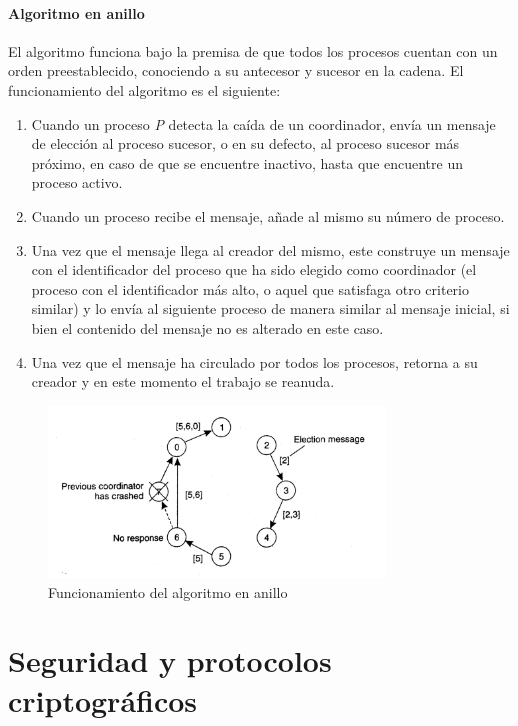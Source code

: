 \paragraph{Algoritmo en anillo}

El algoritmo funciona bajo la premisa de que todos los procesos cuentan con un orden preestablecido, conociendo a su antecesor y sucesor en la cadena\cite{Tanenbaum:2006:DSP:1202502:Ch6}. El funcionamiento del algoritmo es el siguiente:

\begin{enumerate}
  \item Cuando un proceso \textit{P} detecta la caída de un coordinador, envía un mensaje de elección al proceso sucesor, o en su defecto, al proceso sucesor más próximo, en caso de que se encuentre inactivo, hasta que encuentre un proceso activo.
  \item Cuando un proceso recibe el mensaje, añade al mismo su número de proceso.
  \item Una vez que el mensaje llega al creador del mismo, este construye un mensaje con el identificador del proceso que ha sido elegido como coordinador (el proceso con el identificador más alto, o aquel que satisfaga otro criterio similar) y lo envía al siguiente proceso de manera similar al mensaje inicial, si bien el contenido del mensaje no es alterado en este caso.
  \item Una vez que el mensaje ha circulado por todos los procesos, retorna a su creador y en este momento el trabajo se reanuda.
\end{enumerate}

\begin{figure}[H]
  \centering
  \includegraphics[width=0.8\textwidth]{Chapter2/Figures/ringalgorithm}
  \caption{Funcionamiento del algoritmo en anillo}
  \label{fig:tanenbaum:ringalgoritm}
\end{figure} 


\section{Seguridad y protocolos criptográficos}

